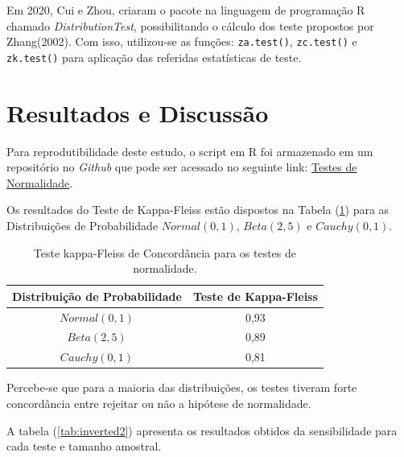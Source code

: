 \documentclass[a4paper,11pt]{article} %
\begin{document}
Em 2020, Cui e Zhou, criaram o pacote na linguagem de programação R chamado \textit{DistributionTest}, possibilitando o cálculo dos teste propostos por Zhang(2002). Com isso,  utilizou-se as funções: \texttt{za.test()}, \texttt{zc.test()} e \texttt{zk.test()} para aplicação das referidas estatísticas de teste.


\section{Resultados e Discussão}

Para reprodutibilidade deste estudo, o script em R foi armazenado em um repositório no \textit{Github} que pode ser acessado no seguinte link: \href{https://github.com/MarioDhiego/Teste\_Normalidade}{Testes de Normalidade}.

\vspace{0.5cm}

Os resultados do Teste de Kappa-Fleiss estão dispostos na Tabela (\ref{tab:resultKappaFleiss}) para as Distribuições de Probabilidade $Normal(0, 1)$, $Beta(2, 5)$ e $Cauchy(0, 1)$.

\begin{table}[H]
\centering
\caption{Teste kappa-Fleiss de Concordância para os testes de normalidade.}
    \begin{tabular}{c|c}
    \hline\hline
    Distribuição de Probabilidade  &  Teste de Kappa-Fleiss\\
    \hline
          $Normal(0, 1)$           &  0,93  \\
          $Beta(2, 5)$             &  0,89  \\
          $Cauchy(0, 1)$           &  0,81  \\
    \hline\hline
    \end{tabular}
    
    \label{tab:resultKappaFleiss}
\end{table}

Percebe-se que para a maioria das distribuições, os testes tiveram forte concordância entre rejeitar ou não a hipótese de normalidade. 

\vspace{0.5cm}

A tabela (\ref{tab:inverted2}) apresenta os resultados obtidos da sensibilidade para cada teste e tamanho amostral.
\end{document}
